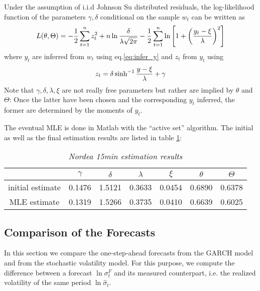 Under the assumption of i.i.d Johnson Su distributed residuals, the
log-likelihood function of the parameters $\gamma, \delta$
conditional on the sample $w_t$ can be written as
\[
L(\theta, \Theta) = -{1 \over 2}\sum_{t=1}^n z_t^2 + n \ln{\delta
  \over \lambda \sqrt{2\pi}} - {1 \over 2}\sum_{t=1}^n \ln\left[
  1 + \left({y_t - \xi \over \lambda}\right)^2
\right]
\]
where $y_t$ are inferred from $w_t$ using eq.\ref{eq:infer_y}
and $z_t$ from $y_t$ using
\[
z_t = \delta \sinh^{-1}{y - \xi \over \lambda} + \gamma
\]
Note that $\gamma, \delta, \lambda, \xi$ are not really free
parameters but rather are implied by $\theta$ and $\Theta$: Once the
latter have been chosen and the corresponding $y_t$ inferred, the
former are determined by the moments of $y_t$.

The eventual MLE is done in Matlab with the ``active set''
algorithm. The initial as well as the final estimation results are
listed in table \ref{tab:nordea_15min_js_param}:
\begin{table}[htb!]
  \centering
  \begin{tabular}{|c|c|c|c|c|c|c|}
    \hline
    & $\gamma$ & $\delta$ & $\lambda$ & $\xi$ & $\theta$ & $\Theta$ \\
    \hline
    initial estimate & 0.1476 & 1.5121 & 0.3633 & 0.0454 & 0.6890 &
    0.6378 \\
    \hline
    MLE estimate & 0.1319 & 1.5266 & 0.3735 & 0.0410 & 0.6639 & 0.6025
    \\
    \hline
  \end{tabular}
  \caption{\small \it Nordea 15min estimation results}
  \label{tab:nordea_15min_js_param}
\end{table}

\subsection{Comparison of the Forecasts}
In this section we compare the one-step-ahead forecasts from the GARCH
model and from the stochastic volatility model. For this purpose, we
compute the difference between a forecast $\ln \sigma^F_t$ and its measured
counterpart, i.e. the realized volatility of the same period $\ln
\hat{\sigma}_t$.

